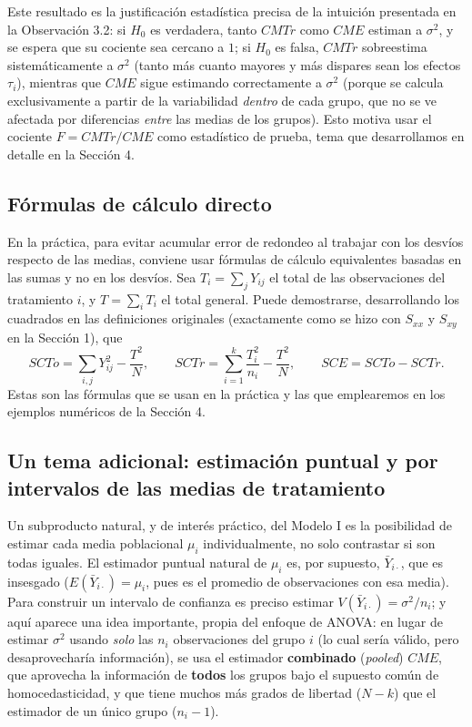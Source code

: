 \documentclass[11pt,a4paper]{article}
\theoremstyle{plain}
\theoremstyle{definition}
\theoremstyle{remark}
\begin{document}
Este resultado es la justificación estadística precisa de la intuición presentada en la Observación 3.2: si $H_0$ es verdadera, tanto $CMTr$ como $CME$ estiman a $\sigma^2$, y se espera que su cociente sea cercano a $1$; si $H_0$ es falsa, $CMTr$ sobreestima sistemáticamente a $\sigma^2$ (tanto más cuanto mayores y más dispares sean los efectos $\tau_i$), mientras que $CME$ sigue estimando correctamente a $\sigma^2$ (porque se calcula exclusivamente a partir de la variabilidad \emph{dentro} de cada grupo, que no se ve afectada por diferencias \emph{entre} las medias de los grupos). Esto motiva usar el cociente $F=CMTr/CME$ como estadístico de prueba, tema que desarrollamos en detalle en la Sección 4.

\subsection{Fórmulas de cálculo directo}

En la práctica, para evitar acumular error de redondeo al trabajar con los desvíos respecto de las medias, conviene usar fórmulas de cálculo equivalentes basadas en las sumas y no en los desvíos. Sea $T_i=\sum_jY_{ij}$ el total de las observaciones del tratamiento $i$, y $T=\sum_iT_i$ el total general. Puede demostrarse, desarrollando los cuadrados en las definiciones originales (exactamente como se hizo con $S_{xx}$ y $S_{xy}$ en la Sección 1), que
\[
SCTo = \sum_{i,j} Y_{ij}^2 - \frac{T^2}{N}, \qquad SCTr = \sum_{i=1}^k \frac{T_i^2}{n_i} - \frac{T^2}{N}, \qquad SCE = SCTo-SCTr.
\]
Estas son las fórmulas que se usan en la práctica y las que emplearemos en los ejemplos numéricos de la Sección 4.

\subsection{Un tema adicional: estimación puntual y por intervalos de las medias de tratamiento}

Un subproducto natural, y de interés práctico, del Modelo I es la posibilidad de estimar cada media poblacional $\mu_i$ individualmente, no solo contrastar si son todas iguales. El estimador puntual natural de $\mu_i$ es, por supuesto, $\bar Y_{i\cdot}$, que es insesgado ($E(\bar Y_{i\cdot})=\mu_i$, pues es el promedio de observaciones con esa media). Para construir un intervalo de confianza es preciso estimar $V(\bar Y_{i\cdot})=\sigma^2/n_i$; y aquí aparece una idea importante, propia del enfoque de ANOVA: en lugar de estimar $\sigma^2$ usando \emph{solo} las $n_i$ observaciones del grupo $i$ (lo cual sería válido, pero desaprovecharía información), se usa el estimador \textbf{combinado} (\emph{pooled}) $CME$, que aprovecha la información de \textbf{todos} los grupos bajo el supuesto común de homocedasticidad, y que tiene muchos más grados de libertad ($N-k$) que el estimador de un único grupo ($n_i-1$).
\end{document}
